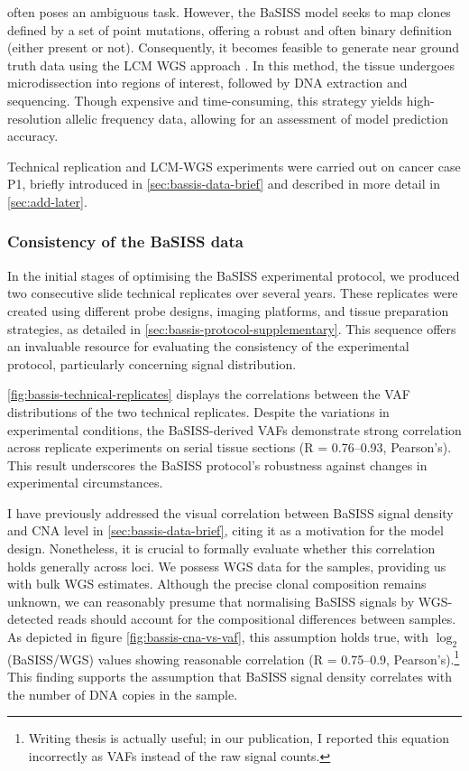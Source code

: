  often poses an ambiguous task. However, the BaSISS model seeks to map clones defined by a set of point mutations, offering a robust and often binary definition (either present or not). Consequently, it becomes feasible to generate near ground truth data using the \ac{LCM} \ac{WGS} approach \parencite{Shen2000-xj}. In this method, the tissue undergoes microdissection into regions of interest, followed by DNA extraction and sequencing. Though expensive and time-consuming, this strategy yields high-resolution allelic frequency data, allowing for an assessment of model prediction accuracy.

Technical replication and \ac{LCM}-\ac{WGS} experiments were carried out on cancer case P1, briefly introduced in \cref{sec:bassis-data-brief} and described in more detail in \cref{sec:add-later}.
\subsubsection*{Consistency of the BaSISS data}
In the initial stages of optimising the \ac{BaSISS} experimental protocol, we produced two consecutive slide technical replicates over several years. These replicates were created using different probe designs, imaging platforms, and tissue preparation strategies, as detailed in \cref{sec:bassis-protocol-supplementary}. This sequence offers an invaluable resource for evaluating the consistency of the experimental protocol, particularly concerning signal distribution.

\cref{fig:bassis-technical-replicates} displays the correlations between the \ac{VAF} distributions of the two technical replicates. Despite the variations in experimental conditions, the \ac{BaSISS}-derived \ac{VAF}s demonstrate strong correlation across replicate experiments on serial tissue sections (R = 0.76–0.93, Pearson's). This result underscores the \ac{BaSISS} protocol's robustness against changes in experimental circumstances.

I have previously addressed the visual correlation between \ac{BaSISS} signal density and \ac{CNA} level in \cref{sec:bassis-data-brief}, citing it as a motivation for the model design. Nonetheless, it is crucial to formally evaluate whether this correlation holds generally across loci. We possess \ac{WGS} data for the samples, providing us with bulk \ac{WGS} estimates. Although the precise clonal composition remains unknown, we can reasonably presume that normalising \ac{BaSISS} signals by \ac{WGS}-detected reads should account for the compositional differences between samples. As depicted in figure \cref{fig:bassis-cna-vs-vaf}, this assumption holds true, with $\log_2$(BaSISS/WGS) values showing reasonable correlation (R = 0.75–0.9, Pearson’s).\footnote{Writing thesis is actually useful; in our publication, I reported this equation incorrectly as \ac{VAF}s instead of the raw signal counts.} This finding supports the assumption that \ac{BaSISS} signal density correlates with the number of DNA copies in the sample.

